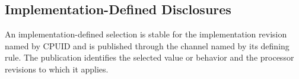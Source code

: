\subsection{Implementation-Defined Disclosures}

An implementation-defined selection is stable for the implementation revision named by CPUID and is published
through the channel named by its defining rule. The publication identifies the selected value or behavior and the
processor revisions to which it applies.

\BedrockGeneratedImplementationDisclosures
